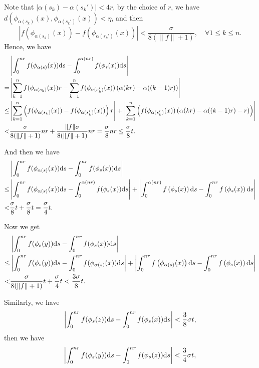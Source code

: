 \documentclass[10pt]{article}
\newtheorem*{Theorem A}{Theorem A}
\begin{document}
Note that $|\alpha(s_k)-\alpha(s_k')|< 4r$, by the choice of \( r \), we have \( d(\phi_{\alpha(s_k)}(x), \phi_{\alpha(s_k')}(x) ) < \eta \), and then
\[
\left| f( \phi_{\alpha(s_k)}(x) ) - f( \phi_{\alpha(s_k')}(x) ) \right| < \frac{\sigma}{8(\|f\| + 1)}, \quad \forall 1 \leq k \leq n.
\]
Hence, we have
\[
\begin{aligned}
&\left| \int_0^{nr} f( \phi_{\alpha(s)}(x) ) {\rm d}s - \int_0^{\alpha(nr)} f( \phi_s(x) ) {\rm d}s \right| \\
=& \left| \sum_{k=1}^n f( \phi_{\alpha(s_k)}(x) ) r - \sum_{k=1}^nf( \phi_{\alpha(s_k')}(x) ) \left( \alpha(kr) - \alpha((k - 1)r) \right) \right| \\
\leq &\left| \sum_{k=1}^n \left( f( \phi_{\alpha(s_k)}(x) ) - f( \phi_{\alpha(s_k')}(x) ) \right) r \right| +  \left| \sum_{k=1}^n \left(f( \phi_{\alpha(s_k')}(x) ) \left( \alpha(kr) - \alpha((k - 1)r) - r \right) \right)\right| \\
<& \frac{\sigma}{8(\|f\| + 1)} nr + \frac{\|f\| \sigma}{8(\|f\| + 1)} nr = \frac{\sigma}{8}nr \leq  \frac{\sigma}{8} t.
\end{aligned}
\]

\noindent
And then we have
\[
\begin{aligned}
&\left| \int_0^{nr} f( \phi_{\alpha(s)}(x) ) {\rm d}s - \int_0^{nr} f( \phi_s(x) ) {\rm d}s \right| \\
\leq& \left| \int_0^{nr} f( \phi_{\alpha(s)}(x) ) {\rm d}s - \int_0^{\alpha(nr)} f( \phi_s(x) ) {\rm d}s \right| + \left| \int_0^{\alpha(nr)} f\left( \phi_s(x) \right) {\rm d}s - \int_0^{nr} f\left( \phi_s(x) \right) {\rm d}s \right| \\
<& \frac{\sigma}{8} t + \frac{\sigma}{8} t = \frac{\sigma}{4} t.
\end{aligned}
\]

\noindent
Now we get
\[
\begin{aligned}
&\left| \int_0^{nr} f( \phi_s (y) ) {\rm d}s - \int_0^{nr} f( \phi_s(x) ) {\rm d}s \right|\\
\leq& \left| \int_0^{nr} f( \phi_s (y) ) {\rm d}s - \int_0^{nr} f( \phi_{\alpha(s)}(x) ) {\rm d}s \right| + \left| \int_0^{nr} f\left( \phi_{\alpha(s)}(x) \right) {\rm d}s - \int_0^{nr} f\left( \phi_s (x) \right) {\rm d}s \right| \\
<& \frac{\sigma}{8(\|f\| + 1)} t + \frac{\sigma}{4} t < \frac{3\sigma}{8} t.
\end{aligned}
\]

\noindent
Similarly, we have
\[
\left| \int_0^{nr} f( \phi_s (z) ) {\rm d}s - \int_0^{nr} f( \phi_s (x) ) {\rm d}s \right| < \frac{3}{8}\sigma t,
\]
then we have
\[
\left| \int_0^{nr} f( \phi_s (y) ) {\rm d}s - \int_0^{nr} f( \phi_s (z) ) {\rm d}s \right| < \frac{3}{4} \sigma t,
\]
\end{document}
